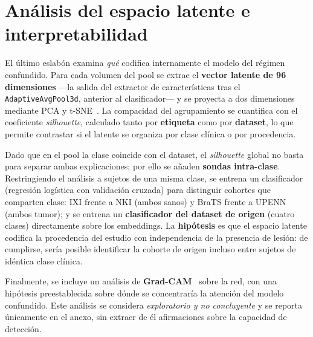 \section{Análisis del espacio latente e interpretabilidad}

El último eslabón examina \emph{qué} codifica internamente el modelo del régimen
confundido. Para cada volumen del pool se extrae el \textbf{vector latente de 96
dimensiones} ---la salida del extractor de características tras el
\texttt{AdaptiveAvgPool3d}, anterior al clasificador--- y se proyecta a dos
dimensiones mediante PCA y t-SNE~\cite{maaten2008tsne}. La compacidad del
agrupamiento se cuantifica con el coeficiente \emph{silhouette}, calculado tanto
por \textbf{etiqueta} como por \textbf{dataset}, lo que permite contrastar si el
latente se organiza por clase clínica o por procedencia.

Dado que en el pool la clase coincide con el dataset, el \emph{silhouette}
global no basta para separar ambas explicaciones; por ello se añaden
\textbf{sondas intra-clase}. Restringiendo el análisis a sujetos de una misma
clase, se entrena un clasificador (regresión logística con validación cruzada)
para distinguir cohortes que comparten clase: IXI frente a NKI (ambos sanos) y
BraTS frente a UPENN (ambos tumor); y se entrena un \textbf{clasificador del
dataset de origen} (cuatro clases) directamente sobre los embeddings. La
\textbf{hipótesis} es que el espacio latente codifica la procedencia del estudio
con independencia de la presencia de lesión: de cumplirse, sería posible
identificar la cohorte de origen incluso entre sujetos de idéntica clase clínica.

Finalmente, se incluye un análisis de \textbf{Grad-CAM}~\cite{selvaraju2017gradcam}
sobre la red, con una hipótesis preestablecida sobre dónde se concentraría la
atención del modelo confundido. Este análisis se considera \emph{exploratorio y
no concluyente} y se reporta únicamente en el anexo, sin extraer de él
afirmaciones sobre la capacidad de detección.
